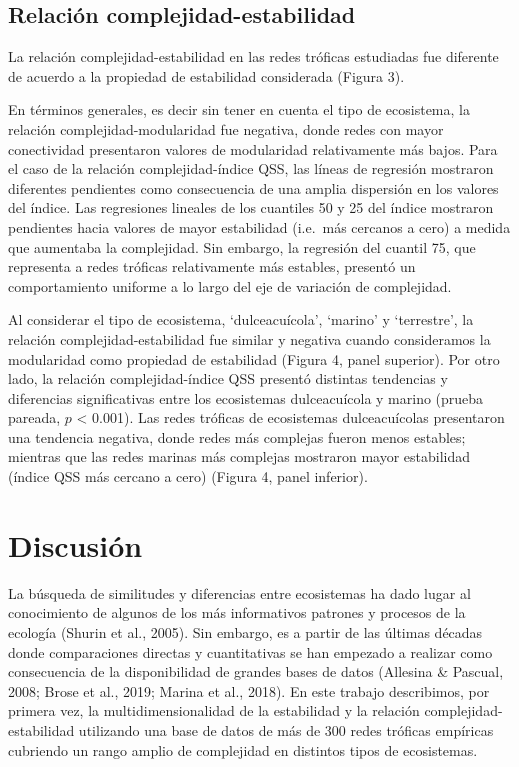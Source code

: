 \documentclass[
]{article}
\begin{document}
\hypertarget{relaciuxf3n-complejidad-estabilidad}{%
\subsection{Relación
complejidad-estabilidad}\label{relaciuxf3n-complejidad-estabilidad}}

La relación complejidad-estabilidad en las redes tróficas estudiadas fue
diferente de acuerdo a la propiedad de estabilidad considerada (Figura
3).

En términos generales, es decir sin tener en cuenta el tipo de
ecosistema, la relación complejidad-modularidad fue negativa, donde
redes con mayor conectividad presentaron valores de modularidad
relativamente más bajos. Para el caso de la relación complejidad-índice
QSS, las líneas de regresión mostraron diferentes pendientes como
consecuencia de una amplia dispersión en los valores del índice. Las
regresiones lineales de los cuantiles 50 y 25 del índice mostraron
pendientes hacia valores de mayor estabilidad (i.e.~más cercanos a cero)
a medida que aumentaba la complejidad. Sin embargo, la regresión del
cuantil 75, que representa a redes tróficas relativamente más estables,
presentó un comportamiento uniforme a lo largo del eje de variación de
complejidad.

Al considerar el tipo de ecosistema, `dulceacuícola', `marino' y
`terrestre', la relación complejidad-estabilidad fue similar y negativa
cuando consideramos la modularidad como propiedad de estabilidad (Figura
4, panel superior). Por otro lado, la relación complejidad-índice QSS
presentó distintas tendencias y diferencias significativas entre los
ecosistemas dulceacuícola y marino (prueba pareada, \(p\) \textless{}
0.001). Las redes tróficas de ecosistemas dulceacuícolas presentaron una
tendencia negativa, donde redes más complejas fueron menos estables;
mientras que las redes marinas más complejas mostraron mayor estabilidad
(índice QSS más cercano a cero) (Figura 4, panel inferior).

\hypertarget{discusiuxf3n}{%
\section{Discusión}\label{discusiuxf3n}}

La búsqueda de similitudes y diferencias entre ecosistemas ha dado lugar
al conocimiento de algunos de los más informativos patrones y procesos
de la ecología (Shurin et al., 2005). Sin embargo, es a partir de las
últimas décadas donde comparaciones directas y cuantitativas se han
empezado a realizar como consecuencia de la disponibilidad de grandes
bases de datos (Allesina \& Pascual, 2008; Brose et al., 2019; Marina et
al., 2018). En este trabajo describimos, por primera vez, la
multidimensionalidad de la estabilidad y la relación
complejidad-estabilidad utilizando una base de datos de más de 300 redes
tróficas empíricas cubriendo un rango amplio de complejidad en distintos
tipos de ecosistemas.
\end{document}
